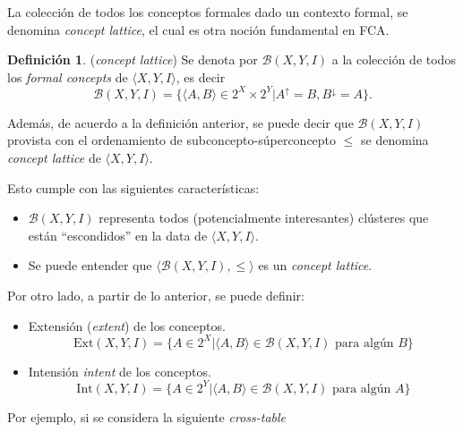 \documentclass[12pt,oneside,letterpaper]{book}
\newcommand{\eng}[1]{\textit{#1}\xspace}			%
\newcommand{\abr}[1]{\textsc{#1}\xspace}           %
\theoremstyle{definition}
\newtheorem{definition}{Definición}[section]
\newcommand{\Beta}{\mathcal{B}}
\begin{document}
La colección de todos los conceptos formales dado un contexto formal, se denomina \eng{concept lattice}, el cual es otra noción fundamental en \abr{FCA}.

\begin{definition}{(\eng{concept lattice})}
	Se denota por $\Beta(X,Y,I)$ a la colección de todos los \eng{formal concepts} de $\langle X,Y,I \rangle$, es decir
\begin{equation*}
	\Beta(X,Y,I) = \{\langle A,B\rangle \in 2^X\times2^Y | A^\uparrow = B, B^\downarrow = A\}.
\end{equation*}
\end{definition}

Además, de acuerdo a la definición anterior, se puede decir que $\Beta(X,Y,I)$ provista con el ordenamiento de subconcepto-súperconcepto $\le$ se denomina \eng{concept lattice} de $\langle X,Y,I \rangle$.

Esto cumple con las siguientes características:

\begin{itemize}
	\item $\Beta(X,Y,I)$ representa todos (potencialmente interesantes) clústeres que están ``escondidos'' en la data de $\langle X,Y,I \rangle$.
	\item Se puede entender que $\langle \Beta(X,Y,I),\le \rangle$ es un \eng{concept lattice}.
\end{itemize}

Por otro lado, a partir de lo anterior, se puede definir:

\begin{itemize}
	\item Extensión (\eng{extent}) de los conceptos.
		\begin{equation*}
			\text{Ext}(X,Y,I) = \{A \in 2^X | \langle A,B \rangle \in \Beta(X,Y,I) \text{ para algún }B \}		
		\end{equation*}
	\item Intensión \eng{intent} de los conceptos.
		\begin{equation*}
			\text{Int}(X,Y,I) = \{A \in 2^Y | \langle A,B \rangle \in \Beta(X,Y,I) \text{ para algún }A \}
		\end{equation*}
\end{itemize}





Por ejemplo, si se considera la siguiente \eng{cross-table} ~\cite{Ganter1997}
\end{document}
